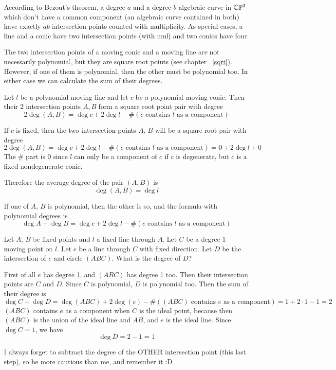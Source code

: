 \documentclass[a4paper]{article}
\begin{document}
According to Bezout's theorem, a degree $a$ and a degree $b$ algebraic curve in $\mathbb{C}\mathbb{P}^2$ which don't have a common component (an algebraic curve contained in both) have exactly $ab$ intersection points counted with multiplicity. As special cases, a line and a conic have two intersection points (with mul) and two conics have four.

The two intersection points of a moving conic and a moving line are not necessarily polynomial, but they are square root points (see chapter ~\ref{sqrt}). However, if one of them is polynomial, then the other must be polynomial too. In either case we can calculate the sum of their degrees.

\begin{theorem}
    Let $l$ be a polynomial moving line and let $c$ be a polynomial moving conic. Then their 2 intersection points $A,B$ form a square root point pair with degree
    $$2\deg (A,B)= \deg c + 2\deg l-\#(\text{$c$ contains $l$ as a component})$$
\end{theorem}
\begin{example}
    If $c$ is fixed, then the two intersection points $A$, $B$ will be a square root pair with degree
    $$2\deg(A,B)=\deg c + 2\deg l-\#(\text{$c$ contains $l$ as a component})=0+2\deg l+0$$
    The $\#$ part is 0 since $l$ can only be a component of $c$ if $c$ is degenerate, but $c$ is a fixed nondegenerate conic.
    
    Therefore the average degree of the pair $(A,B)$ is
    $$\deg(A,B)=\deg l$$
\end{example}
\begin{remark}
    If one of $A$, $B$ is polynomial, then the other is so, and the formula with polynomial degrees is
    $$\deg A+\deg B= \deg c + 2\deg l-\#(\text{$c$ contains $l$ as a component})$$
\end{remark}
\begin{example}
    Let $A$, $B$ be fixed points and $l$ a fixed line through $A$. Let $C$ be a degree 1 moving point on $l$. Let $e$ be a line through $C$ with fixed direction. Let $D$ be the intersection of $e$ and circle $(ABC)$. What is the degree of $D$?

    First of all $e$ has degree 1, and $(ABC)$ has degree 1 too. Then their intersection points are $C$ and $D$. Since $C$ is polynomial, $D$ is polynomial too. Then the sum of their degree is
    $$\deg C+\deg D=\deg (ABC)+2\deg (e)-\#(\text{$(ABC)$ contains $e$ as a component})=1+2\cdot 1-1=2$$
    $(ABC)$ contains $e$ as a component when $C$ is the ideal point, because then $(ABC)$ is the union of the ideal line and $AB$, and $e$ is the ideal line. Since $\deg C=1$, we have
    $$\deg D=2-1=1$$

    I always forget to subtract the degree of the OTHER intersection point (this last step), so be more cautious than me, and remember it :D
\end{example}
\end{document}
